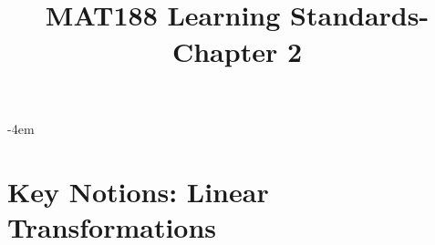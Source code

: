 \documentclass[12pt,oneside,english]{amsart}
\numberwithin{equation}{section}
\numberwithin{figure}{section}
\newif\ifshowSoln
\begin{document}
	
\title{
	\textbf{	 \\ MAT188 Learning Standards-Chapter 2
        }  
	\ifshowSoln
	and notes for instructors
	\else
{}
	\fi
}

\kern -4em

\maketitle

\section*{\color{blue} Key Notions: Linear Transformations
    }

\end{document}
